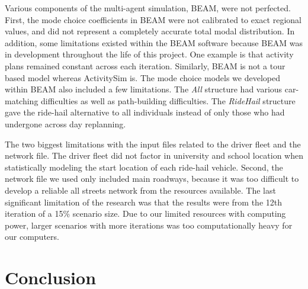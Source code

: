 \documentclass[fancy, masters]{byuthesis}
\begin{document}
Various components of the multi-agent simulation, BEAM, were not perfected. First, the mode choice coefficients in BEAM were not calibrated to exact regional values, and did not represent a completely accurate total modal distribution. In addition, some limitations existed within the BEAM software because BEAM was in development throughout the life of this project. One example is that activity plans remained constant across each iteration. Similarly, BEAM is not a tour based model whereas ActivitySim is. The mode choice models we developed within BEAM also included a few limitations. The \emph{All} structure had various car-matching difficulties as well as path-building difficulties. The \emph{RideHail} structure gave the ride-hail alternative to all individuals instead of only those who had undergone across day replanning.

The two biggest limitations with the input files related to the driver fleet and the network file. The driver fleet did not factor in university and school location when statistically modeling the start location of each ride-hail vehicle. Second, the network file we used only included main roadways, because it was too difficult to develop a reliable all streets network from the resources available. The last significant limitation of the research was that the results were from the 12th iteration of a 15\% scenario size. Due to our limited resources with computing power, larger scenarios with more iterations was too computationally heavy for our computers.

\hypertarget{conclusion}{%
\chapter{Conclusion}\label{conclusion}}
\end{document}
